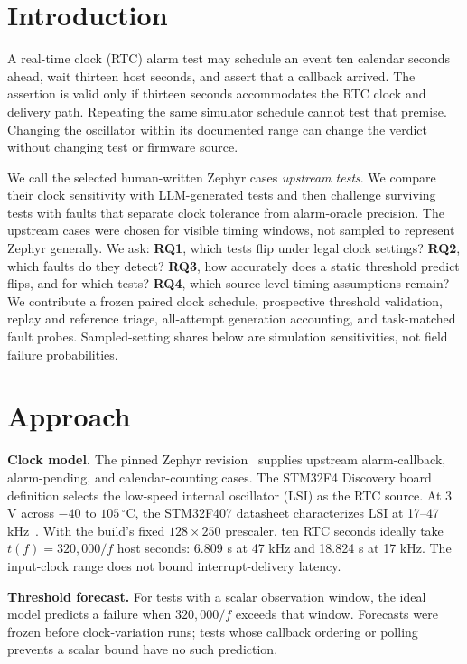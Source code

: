 \documentclass[sigconf,nonacm]{acmart}
\begin{document}
\section{Introduction}
A real-time clock (RTC) alarm test may schedule an event ten calendar seconds ahead, wait thirteen host seconds, and assert that a callback arrived. The assertion is valid only if thirteen seconds accommodates the RTC clock and delivery path. Repeating the same simulator schedule cannot test that premise. Changing the oscillator within its documented range can change the verdict without changing test or firmware source.

We call the selected human-written Zephyr cases \emph{upstream tests}. We compare their clock sensitivity with LLM-generated tests and then challenge surviving tests with faults that separate clock tolerance from alarm-oracle precision. The upstream cases were chosen for visible timing windows, not sampled to represent Zephyr generally. We ask: \textbf{RQ1}, which tests flip under legal clock settings? \textbf{RQ2}, which faults do they detect? \textbf{RQ3}, how accurately does a static threshold predict flips, and for which tests? \textbf{RQ4}, which source-level timing assumptions remain? We contribute a frozen paired clock schedule, prospective threshold validation, replay and reference triage, all-attempt generation accounting, and task-matched fault probes. Sampled-setting shares below are simulation sensitivities, not field failure probabilities.

\section{Approach}
\textbf{Clock model.} The pinned Zephyr revision~\cite{zephyrpinned} supplies upstream alarm-callback, alarm-pending, and calendar-counting cases. The STM32F4 Discovery board definition selects the low-speed internal oscillator (LSI) as the RTC source. At 3 V across $-40$ to $105\,^{\circ}$C, the STM32F407 datasheet characterizes LSI at 17--47 kHz~\cite{stm32f407datasheet}. With the build's fixed $128\times250$ prescaler, ten RTC seconds ideally take $t(f)=320{,}000/f$ host seconds: 6.809 s at 47 kHz and 18.824 s at 17 kHz. The input-clock range does not bound interrupt-delivery latency.

\textbf{Threshold forecast.} For tests with a scalar observation window, the ideal model predicts a failure when $320{,}000/f$ exceeds that window. Forecasts were frozen before clock-variation runs; tests whose callback ordering or polling prevents a scalar bound have no such prediction.
\end{document}
